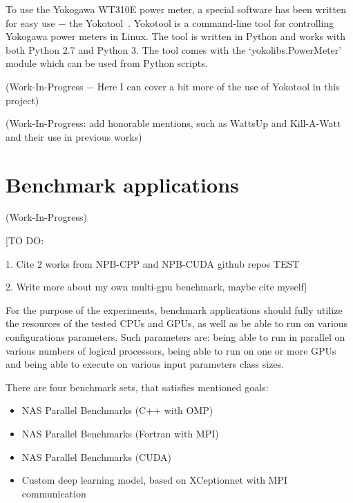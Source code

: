 To use the Yokogawa WT310E power meter, a special software has
been written for easy use $-$ the Yokotool~\cite{GitHub_intel/yoko-tool}.
Yokotool is a command-line tool for controlling Yokogawa power
meters in Linux. The tool is written in Python and works with both
Python 2.7 and Python 3. The tool comes with the
`yokolibs.PowerMeter' module which can be used from Python scripts.

(Work-In-Progress $-$ Here I can cover a bit more of the use
of Yokotool in this project)

(Work-In-Progress: add honorable mentions, such as WattsUp
and Kill-A-Watt~\cite{Power_Aware_GPU_Computing} and their
use in previous works)

\section{Benchmark applications}

(Work-In-Progress)

[TO DO\@:

1. Cite 2 works from NPB-CPP and NPB-CUDA github repos TEST

2. Write more about my own multi-gpu benchmark, maybe cite myself]

For the purpose of the experiments, benchmark applications should
fully utilize the resources of the tested CPUs and GPUs, as well as
be able to run on various configurations parameters. Such parameters
are: being able to run in parallel on various numbers of logical
processors, being able to run on one or more GPUs and being able to
execute on various input parameters class sizes.

There are four benchmark sets, that satisfies mentioned goals:
\begin{itemize}
    \item NAS Parallel Benchmarks (C++ with OMP)
    \item NAS Parallel Benchmarks (Fortran with MPI)
    \item NAS Parallel Benchmarks (CUDA)
    \item Custom deep learning model, based on XCeptionnet with MPI communication
\end{itemize}

